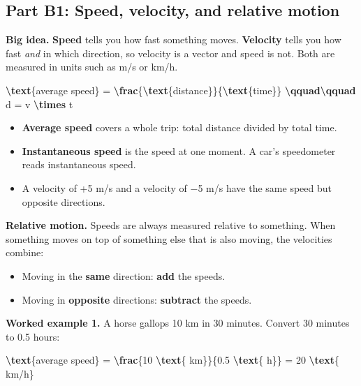 \documentclass[
]{article}
\newenvironment{Shaded}{\begin{snugshade}}{\end{snugshade}}
\newcommand{\FunctionTok}[1]{\textcolor[rgb]{0.13,0.29,0.53}{\textbf{#1}}}
\newcommand{\NormalTok}[1]{#1}
\providecommand{\tightlist}{%
  \setlength{\itemsep}{0pt}\setlength{\parskip}{0pt}}
\begin{document}
\subsection{Part B1: Speed, velocity, and relative
motion}\label{part-b1-speed-velocity-and-relative-motion}

\textbf{Big idea.} \textbf{Speed} tells you how fast something moves.
\textbf{Velocity} tells you how fast \emph{and} in which direction, so
velocity is a vector and speed is not. Both are measured in units such
as m/s or km/h.

\begin{Shaded}
\begin{Highlighting}[]
\FunctionTok{\textbackslash{}text}\NormalTok{\{average speed\} = }\FunctionTok{\textbackslash{}frac}\NormalTok{\{}\FunctionTok{\textbackslash{}text}\NormalTok{\{distance\}\}\{}\FunctionTok{\textbackslash{}text}\NormalTok{\{time\}\} }\FunctionTok{\textbackslash{}qquad\textbackslash{}qquad}\NormalTok{ d = v }\FunctionTok{\textbackslash{}times}\NormalTok{ t}
\end{Highlighting}
\end{Shaded}

\begin{itemize}
\tightlist
\item
  \textbf{Average speed} covers a whole trip: total distance divided by
  total time.
\item
  \textbf{Instantaneous speed} is the speed at one moment. A car's
  speedometer reads instantaneous speed.
\item
  A velocity of +5 m/s and a velocity of −5 m/s have the same speed but
  opposite directions.
\end{itemize}

\textbf{Relative motion.} Speeds are always measured relative to
something. When something moves on top of something else that is also
moving, the velocities combine:

\begin{itemize}
\tightlist
\item
  Moving in the \textbf{same} direction: \textbf{add} the speeds.
\item
  Moving in \textbf{opposite} directions: \textbf{subtract} the speeds.
\end{itemize}

\textbf{Worked example 1.} A horse gallops 10 km in 30 minutes. Convert
30 minutes to 0.5 hours:

\begin{Shaded}
\begin{Highlighting}[]
\FunctionTok{\textbackslash{}text}\NormalTok{\{average speed\} = }\FunctionTok{\textbackslash{}frac}\NormalTok{\{10 }\FunctionTok{\textbackslash{}text}\NormalTok{\{ km\}\}\{0.5 }\FunctionTok{\textbackslash{}text}\NormalTok{\{ h\}\} = 20 }\FunctionTok{\textbackslash{}text}\NormalTok{\{ km/h\}}
\end{Highlighting}
\end{Shaded}
\end{document}
